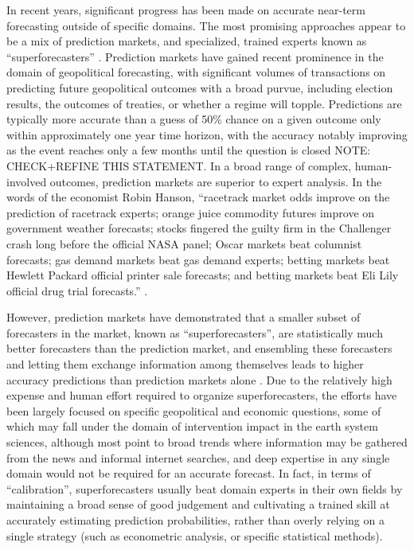 \documentclass[12pt,a4paper]{article}
\begin{document}
In recent years, significant progress has been made on accurate near-term forecasting outside of specific domains. The most promising approaches appear to be a mix of prediction markets, and specialized, trained experts known as ``superforecasters'' . Prediction markets have gained recent prominence in the domain of geopolitical forecasting, with significant volumes of transactions on predicting future geopolitical outcomes with a broad purvue, including election results, the outcomes of treaties, or whether a regime will topple. Predictions are typically more accurate than a guess of 50\% chance on a given outcome only within approximately one year time horizon, with the accuracy notably improving as the event reaches only a few months until the question is closed  NOTE: CHECK+REFINE THIS STATEMENT.  In a broad range of complex, human-involved outcomes, prediction markets are superior to expert analysis. In the words of the economist Robin Hanson, ``racetrack market odds improve on the prediction of racetrack  experts; orange juice commodity futures improve on government weather forecasts;  stocks fingered the guilty firm in the Challenger crash long before the official NASA  panel; Oscar markets beat columnist forecasts; gas demand markets beat gas  demand experts; betting markets beat Hewlett Packard official printer sale  forecasts; and betting markets beat Eli Lily official drug trial forecasts.''  . 

However, prediction markets have demonstrated that a smaller subset of forecasters in the market, known as ``superforecasters'', are statistically much better forecasters than the prediction market, and ensembling these forecasters and letting them exchange information among themselves leads to higher accuracy predictions than prediction markets alone . Due to the relatively high expense and human effort required to organize superforecasters, the efforts have been largely focused on specific geopolitical and economic questions, some of which may fall under the domain of intervention impact in the earth system sciences, although most point to broad trends where information may be gathered from the news and informal internet searches, and deep expertise in any single domain would not be required for an accurate forecast. In fact, in terms of ``calibration'', superforecasters usually beat domain experts in their own fields by maintaining a broad sense of good judgement and cultivating a trained skill at accurately estimating prediction probabilities, rather than overly relying on a single strategy (such as econometric analysis, or specific statistical methods).
\end{document}
